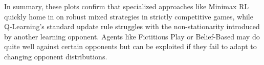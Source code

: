 \documentclass[11pt]{article}
\begin{document}
In summary, these plots confirm that specialized approaches like Minimax 
RL quickly home in on robust mixed strategies in strictly competitive 
games, while Q-Learning’s standard update rule struggles with the 
non-stationarity introduced by another learning opponent. Agents like 
Fictitious Play or Belief-Based may do quite well against certain 
opponents but can be exploited if they fail to adapt to changing 
opponent distributions.
\end{document}

